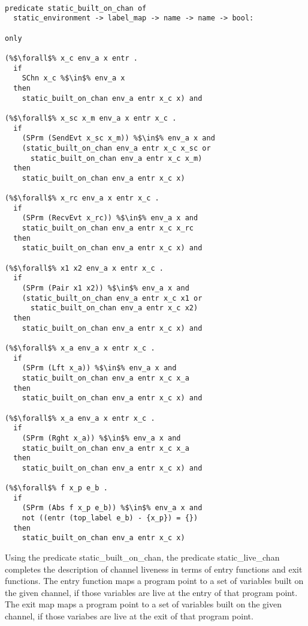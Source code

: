 \documentclass{article}
\begin{document}
\begin{lstlisting}[language=logic, escapechar=\%]

predicate static_built_on_chan of
  static_environment -> label_map -> name -> name -> bool:

only

(%$\forall$% x_c env_a x entr .
  if 
    SChn x_c %$\in$% env_a x 
  then 
    static_built_on_chan env_a entr x_c x) and

(%$\forall$% x_sc x_m env_a x entr x_c . 
  if
    (SPrm (SendEvt x_sc x_m)) %$\in$% env_a x and
    (static_built_on_chan env_a entr x_c x_sc or
      static_built_on_chan env_a entr x_c x_m)
  then 
    static_built_on_chan env_a entr x_c x)

(%$\forall$% x_rc env_a x entr x_c . 
  if  
    (SPrm (RecvEvt x_rc)) %$\in$% env_a x and
    static_built_on_chan env_a entr x_c x_rc
  then 
    static_built_on_chan env_a entr x_c x) and
  
(%$\forall$% x1 x2 env_a x entr x_c . 
  if  
    (SPrm (Pair x1 x2)) %$\in$% env_a x and
    (static_built_on_chan env_a entr x_c x1 or
      static_built_on_chan env_a entr x_c x2)
  then 
    static_built_on_chan env_a entr x_c x) and

(%$\forall$% x_a env_a x entr x_c .
  if
    (SPrm (Lft x_a)) %$\in$% env_a x and
    static_built_on_chan env_a entr x_c x_a
  then 
    static_built_on_chan env_a entr x_c x) and

(%$\forall$% x_a env_a x entr x_c .
  if
    (SPrm (Rght x_a)) %$\in$% env_a x and
    static_built_on_chan env_a entr x_c x_a
  then 
    static_built_on_chan env_a entr x_c x) and

(%$\forall$% f x_p e_b .
  if
    (SPrm (Abs f x_p e_b)) %$\in$% env_a x and
    not ((entr (top_label e_b) - {x_p}) = {})
  then
    static_built_on_chan env_a entr x_c x)

  \end{lstlisting}


Using the predicate static\_built\_on\_chan, the predicate static\_live\_chan completes the
description of channel liveness in terms of entry functions and exit functions. The entry
function maps a program point to a set of variables built on the given channel, if those
variables are live at the entry of that program point.  The exit map maps a program point to a
set of variables built on the given channel, if those variabes are live at the exit of that
program point.
\end{document}
